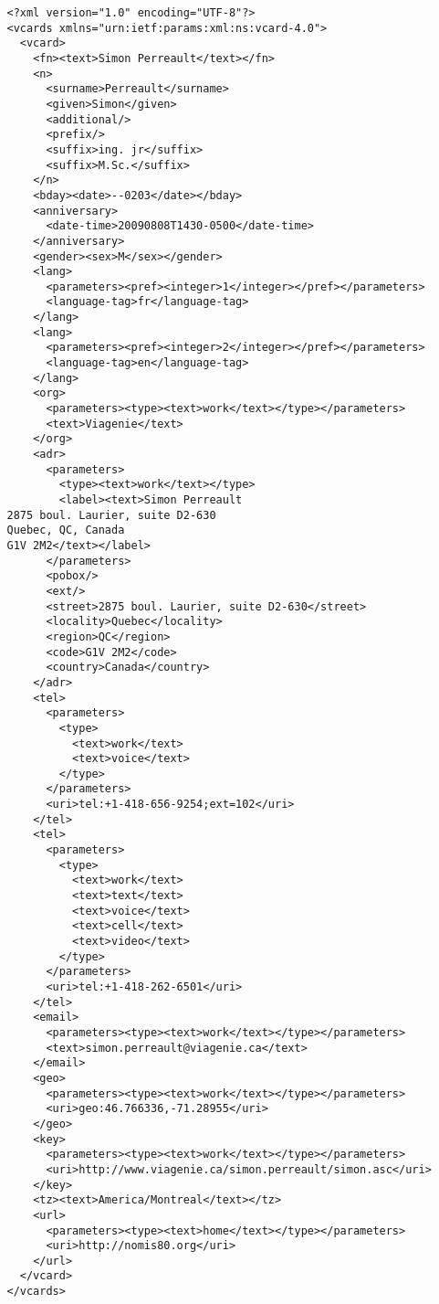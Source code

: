 \documentclass[12pt,a4paper]{scrartcl}		%
\begin{document}
\begin{lstlisting}
   <?xml version="1.0" encoding="UTF-8"?>
   <vcards xmlns="urn:ietf:params:xml:ns:vcard-4.0">
     <vcard>
       <fn><text>Simon Perreault</text></fn>
       <n>
         <surname>Perreault</surname>
         <given>Simon</given>
         <additional/>
         <prefix/>
         <suffix>ing. jr</suffix>
         <suffix>M.Sc.</suffix>
       </n>
       <bday><date>--0203</date></bday>
       <anniversary>
         <date-time>20090808T1430-0500</date-time>
       </anniversary>
       <gender><sex>M</sex></gender>
       <lang>
         <parameters><pref><integer>1</integer></pref></parameters>
         <language-tag>fr</language-tag>
       </lang>
       <lang>
         <parameters><pref><integer>2</integer></pref></parameters>
         <language-tag>en</language-tag>
       </lang>
       <org>
         <parameters><type><text>work</text></type></parameters>
         <text>Viagenie</text>
       </org>
       <adr>
         <parameters>
           <type><text>work</text></type>
           <label><text>Simon Perreault
   2875 boul. Laurier, suite D2-630
   Quebec, QC, Canada
   G1V 2M2</text></label>
         </parameters>
         <pobox/>
         <ext/>
         <street>2875 boul. Laurier, suite D2-630</street>
         <locality>Quebec</locality>
         <region>QC</region>
         <code>G1V 2M2</code>
         <country>Canada</country>
       </adr>
       <tel>
         <parameters>
           <type>
             <text>work</text>
             <text>voice</text>
           </type>
         </parameters>
         <uri>tel:+1-418-656-9254;ext=102</uri>
       </tel>
       <tel>
         <parameters>
           <type>
             <text>work</text>
             <text>text</text>
             <text>voice</text>
             <text>cell</text>
             <text>video</text>
           </type>
         </parameters>
         <uri>tel:+1-418-262-6501</uri>
       </tel>
       <email>
         <parameters><type><text>work</text></type></parameters>
         <text>simon.perreault@viagenie.ca</text>
       </email>
       <geo>
         <parameters><type><text>work</text></type></parameters>
         <uri>geo:46.766336,-71.28955</uri>
       </geo>
       <key>
         <parameters><type><text>work</text></type></parameters>
         <uri>http://www.viagenie.ca/simon.perreault/simon.asc</uri>
       </key>
       <tz><text>America/Montreal</text></tz>
       <url>
         <parameters><type><text>home</text></type></parameters>
         <uri>http://nomis80.org</uri>
       </url>
     </vcard>
   </vcards>
\end{lstlisting}
\end{document}
